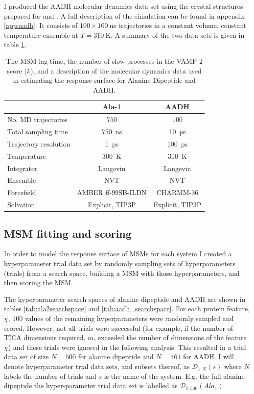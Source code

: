  I produced the AADH molecular dynamics data set using the crystal structures prepared for \cite{masgrauAtomicDescriptionEnzyme2006} and \cite{masgrauTunnelingClassicalPaths2007}. A full description of the simulation can be found in appendix \ref{app:aadh}. It consists of $100\times \SI{100}{\nano\second}$ trajectories in a constant volume, constant temperature ensemble at $T=\SI{310}{\kelvin}$. A summary of the two data sets is given in table \ref{tab:md_specs}. 

\begin{table}
    \centering
    \caption{The MSM lag time, the number of slow processes in the VAMP-2 score ($k$), and a description of the molecular dynamics data used in estimating the response surface for Alanine Dipeptide and AADH.}
    \begin{tabular}{|l|c|c|}
        \hline
         & Ala-1 & AADH \\
         \hline\hline
         No. MD trajectories & $750$ & $100$ \\
         Total sampling time & \SI{750}{\nano\second} & \SI{10}{\micro\second} \\
         Trajectory resolution & \SI{1}{\pico\second} & \SI{100}{\pico\second} \\
         Temperature & \SI{300}{\kelvin} & \SI{310}{\kelvin} \\
         Integrator & Langevin & Langevin \\
         Ensemble & NVT & NVT \\
         Forcefield & AMBER ff-99SB-ILDN & CHARMM-36 \\
         Solvation & Explicit, TIP3P & Explicit, TIP3P \\
         \hline
    \end{tabular}
    \label{tab:md_specs}
\end{table}

\subsection{MSM fitting and scoring}\label{sec:msm_fitting}
In order to  model the response surface of MSMs for each system I created a hyperparameter trial data set by randomly sampling sets of hyperparameters (trials) from a search space, building a MSM with those hyperparameters, and then scoring the MSM. 

The hyperparameter search spaces of alanine dipeptide and AADH are shown in tables \ref{tab:ala2searchspace} and \ref{tab:aadh_searchspace}. For each protein feature, $\chi$, $100$ values of the remaining hyperparameters were randomly sampled and scored. However, not all trials were successful (for example, if the number of TICA dimensions required, $m$, exceeded the number of dimensions of the feature $\chi$) and these trials were ignored in the following analysis. This resulted in a trial data set of size $N=500$ for alanine dipeptide and $N=461$ for AADH. I will denote hyperparameter trial data sets, and subsets thereof, as $\mathcal{D}_{1:N}(s)$ where $N$ labels the number of trials and $s$ is the name of the system. E.g. the full alanine dipeptide the hyper-parameter trial data set is labelled as $\mathcal{D}_{1:500}(Ala_{1})$

